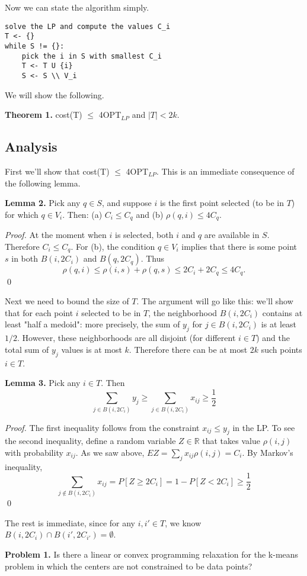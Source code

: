 \documentclass{article}
\begin{document}
Now we can state the algorithm simply.
\begin{verbatim}
solve the LP and compute the values C_i
T <- {}
while S != {}:
    pick the i in S with smallest C_i
    T <- T U {i}
    S <- S \\ V_i
\end{verbatim}

We will show the following.

\textbf{Theorem 1.} cost(T) $\le$ 4OPT$_{LP}$ and $|T| < 2k$.

\subsection{Analysis}

First we'll show that cost(T) $\le$ 4OPT$_{LP}$. This is an immediate consequence of the following lemma.

\textbf{Lemma 2.} Pick any $q \in S$, and suppose $i$ is the first point selected (to be in $T$) for which $q \in V_i$. Then: (a) $C_i \le C_q$ and (b) $\rho(q, i) \le 4C_q$.

\textit{Proof.} At the moment when $i$ is selected, both $i$ and $q$ are available in $S$. Therefore $C_i \le C_q$. For (b), the condition $q \in V_i$ implies that there is some point $s$ in both $B(i, 2C_i)$ and $B(q, 2C_q)$. Thus
\begin{equation*}
\rho(q, i) \le \rho(i, s) + \rho(q, s) \le 2C_i + 2C_q \le 4C_q.
\end{equation*}
\qed

Next we need to bound the size of $T$. The argument will go like this: we'll show that for each point $i$ selected to be in $T$, the neighborhood $B(i, 2C_i)$ contains at least "half a medoid": more precisely, the sum of $y_j$ for $j \in B(i, 2C_i)$ is at least $1/2$. However, these neighborhoods are all disjoint (for different $i \in T$) and the total sum of $y_j$ values is at most $k$. Therefore there can be at most $2k$ such points $i \in T$.

\textbf{Lemma 3.} Pick any $i \in T$. Then
\begin{equation*}
\sum_{j \in B(i, 2C_i)} y_j \ge \sum_{j \in B(i, 2C_i)} x_{ij} \ge \frac{1}{2}
\end{equation*}

\textit{Proof.} The first inequality follows from the constraint $x_{ij} \le y_j$ in the LP. To see the second inequality, define a random variable $Z \in \mathbb{R}$ that takes value $\rho(i, j)$ with probability $x_{ij}$. As we saw above, $EZ = \sum_j x_{ij} \rho(i, j) = C_i$. By Markov's inequality,
\begin{equation*}
\sum_{j \notin B(i, 2C_i)} x_{ij} = P[Z \ge 2C_i] = 1 - P[Z < 2C_i] \ge \frac{1}{2} %
\end{equation*}
\qed

The rest is immediate, since for any $i, i' \in T$, we know $B(i, 2C_i) \cap B(i', 2C_{i'}) = \emptyset$.

\textbf{Problem 1.} Is there a linear or convex programming relaxation for the k-means problem in which the centers are not constrained to be data points?
\end{document}
